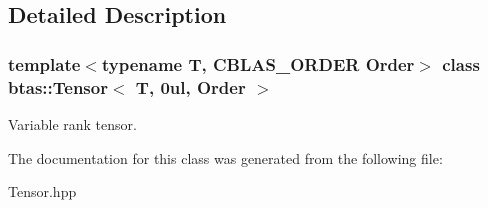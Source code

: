 \subsection{Detailed Description}
\subsubsection*{template$<$typename T, CBLAS\_\-ORDER Order$>$ class btas::Tensor$<$ T, 0ul, Order $>$}

Variable rank tensor. 

The documentation for this class was generated from the following file:\begin{DoxyCompactItemize}
\item 
Tensor.hpp\end{DoxyCompactItemize}
